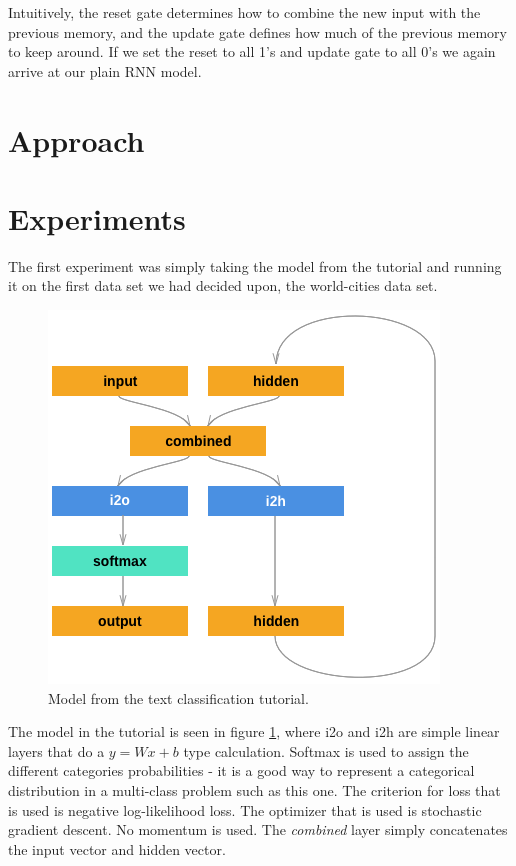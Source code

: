 \documentclass[runningheads]{llncs}
\begin{document}
Intuitively, the reset gate determines how to combine the new input with the previous memory, and the update gate defines how much of the previous memory to keep around. If we set the reset to all 1’s and  update gate to all 0’s we again arrive at our plain RNN model.

\section{Approach}

\section{Experiments}

The first experiment was simply taking the model from the tutorial and running it on the first data set we had decided upon, the world-cities data set. 


\begin{figure}[h!]
	\centering
    \includegraphics[width=.5\textwidth]{plots/tutorial_model.png}
	\caption{ Model from the text classification tutorial.}
	\label{fig:model_tutorial}
\end{figure}

The model in the tutorial is seen in figure \ref{fig:model_tutorial}, where i2o and i2h are simple linear layers that do a $y=Wx + b$ type calculation. Softmax is used to assign the different categories probabilities - it is a good way to represent a categorical distribution in a multi-class problem such as this one.
The criterion for loss that is used is negative log-likelihood loss.
The optimizer that is used is stochastic gradient descent. No momentum is used.
The \textit{combined} layer simply concatenates the input vector and hidden vector.
\end{document}
